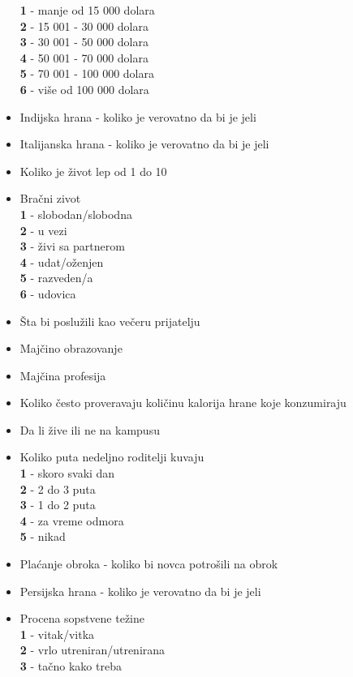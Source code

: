 \documentclass[12pt,a4paper]{article}
\begin{document}
\begin{itemize}
    \textbf{1} - manje od 15 000 dolara\\
    \textbf{2} - 15 001 - 30 000 dolara\\
    \textbf{3} - 30 001 - 50 000 dolara\\
    \textbf{4} - 50 001 - 70 000 dolara\\
    \textbf{5} - 70 001 - 100 000 dolara\\
    \textbf{6} - vi\v se od 100 000 dolara
  \item Indijska hrana - koliko je verovatno da bi je jeli
  \item Italijanska hrana - koliko je verovatno da bi je jeli
  \item Koliko je \v zivot lep od 1 do 10
  \item Bra\v cni zivot\\
    \textbf{1} - slobodan/slobodna\\
    \textbf{2} - u vezi\\
    \textbf{3} - \v zivi sa partnerom\\
    \textbf{4} - udat/o\v zenjen\\
    \textbf{5} - razveden/a\\
    \textbf{6} - udovica
  \item \v Sta bi poslu\v zili kao ve\v ceru prijatelju
  \item Maj\v cino obrazovanje
  \item Maj\v cina profesija
  \item Koliko \v cesto proveravaju koli\v cinu kalorija hrane koje konzumiraju
  \item Da li \v zive ili ne na kampusu
  \item Koliko puta nedeljno roditelji kuvaju\\
    \textbf{1} - skoro svaki dan\\
    \textbf{2} - 2 do 3 puta\\
    \textbf{3} - 1 do 2 puta\\
    \textbf{4} - za vreme odmora\\
    \textbf{5} - nikad
  \item Pla\' canje obroka - koliko bi novca potro\v sili na obrok
  \item Persijska hrana - koliko je verovatno da bi je jeli
  \item Procena sopstvene te\v zine\\
    \textbf{1} - vitak/vitka\\
    \textbf{2} - vrlo utreniran/utrenirana\\
    \textbf{3} - ta\v cno kako treba\\

\end{itemize}
\end{document}
